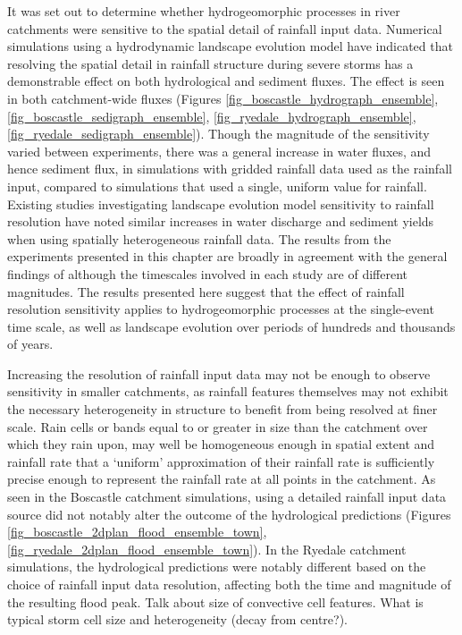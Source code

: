 It was set out to determine whether hydrogeomorphic processes in river catchments were sensitive to the spatial detail of rainfall input data. Numerical simulations using a hydrodynamic landscape evolution model have indicated that resolving the spatial detail in rainfall structure during severe storms has a demonstrable effect on both hydrological and sediment fluxes. The effect is seen in both catchment-wide fluxes (Figures \ref{fig_boscastle_hydrograph_ensemble}, \ref{fig_boscastle_sedigraph_ensemble}, \ref{fig_ryedale_hydrograph_ensemble}, \ref{fig_ryedale_sedigraph_ensemble}). Though the magnitude of the sensitivity varied between experiments, there was a general increase in water fluxes, and hence sediment flux, in simulations with gridded rainfall data used as the rainfall input, compared to simulations that used a single, uniform value for rainfall. Existing studies investigating landscape evolution model sensitivity to rainfall resolution \citep{coulthard2016sensitivity} have noted similar increases in water discharge and sediment yields when using spatially heterogeneous rainfall data. The results from the experiments presented in this chapter are broadly in agreement with the general findings of \citet{coulthard2016sensitivity} although the timescales involved in each study are of different magnitudes. The results presented here suggest that the effect of rainfall resolution sensitivity applies to hydrogeomorphic processes at the single-event time scale, as well as landscape evolution over periods of hundreds and thousands of years.

Increasing the resolution of rainfall input data may not be enough to observe sensitivity in smaller catchments, as rainfall features themselves may not exhibit the necessary heterogeneity in structure to benefit from being resolved at finer scale. Rain cells or bands equal to or greater in size than the catchment over which they rain upon, may well be homogeneous enough in spatial extent and rainfall rate that a `uniform' approximation of their rainfall rate is sufficiently precise enough to represent the rainfall rate at all points in the catchment. As seen in the Boscastle catchment simulations, using a detailed rainfall input data source did not notably alter the outcome of the hydrological predictions (Figures \ref{fig_boscastle_2dplan_flood_ensemble_town}, \ref{fig_ryedale_2dplan_flood_ensemble_town}). In the Ryedale catchment simulations, the hydrological predictions were notably different based on the choice of rainfall input data resolution, affecting both the time and magnitude of the resulting flood peak. 
%
Talk about size of convective cell features. What is typical storm cell size and heterogeneity (decay from centre?).

